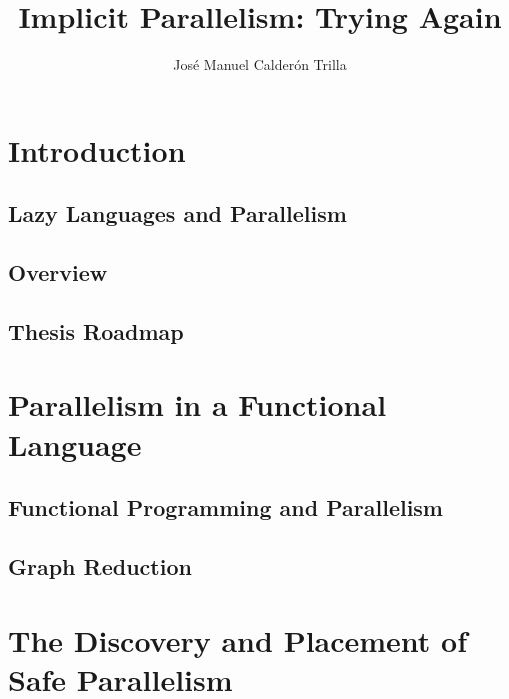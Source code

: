\documentclass[justified]{tufte-book}
\title{Implicit Parallelism: Trying Again}
\author{Jos\'{e} Manuel Calder\'{o}n Trilla}
\newcommand{\blankpage}{\newpage\hbox{}\thispagestyle{empty}\newpage}
\begin{document}
\frontmatter


\maketitle

\tableofcontents
\listoffigures
\listoftables

\chapter{Introduction}

    
    
    \section{Lazy Languages and Parallelism}
    

    \section{Overview}
    

    \section{Thesis Roadmap}

\chapter{Parallelism in a Functional Language}

    

    \section{Functional Programming and Parallelism}
    
    
    \section{Graph Reduction}
    

\chapter{The Discovery and Placement of Safe Parallelism}
\end{document}
